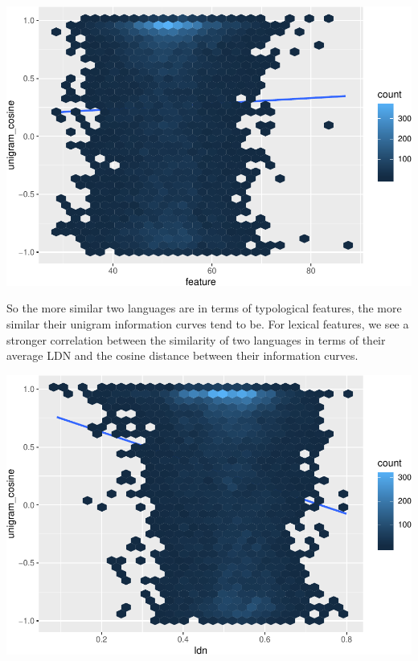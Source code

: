 \documentclass[11pt,]{article}
\newenvironment{Shaded}{\begin{snugshade}}{\end{snugshade}}
\newcommand{\DataTypeTok}[1]{\textcolor[rgb]{0.13,0.29,0.53}{#1}}
\newcommand{\FloatTok}[1]{\textcolor[rgb]{0.00,0.00,0.81}{#1}}
\newcommand{\KeywordTok}[1]{\textcolor[rgb]{0.13,0.29,0.53}{\textbf{#1}}}
\newcommand{\NormalTok}[1]{#1}
\newcommand{\OperatorTok}[1]{\textcolor[rgb]{0.81,0.36,0.00}{\textbf{#1}}}
\newcommand{\StringTok}[1]{\textcolor[rgb]{0.31,0.60,0.02}{#1}}
\begin{document}
\includegraphics{paper_files/figure-latex/wals features vs cosine similarity-1.pdf}

So the more similar two languages are in terms of typological features, the more similar their unigram information curves tend to be. For lexical features, we see a stronger correlation between the similarity of two languages in terms of their average LDN and the cosine distance between their information curves.

\begin{Shaded}
\end{Shaded}

\includegraphics{paper_files/figure-latex/ldn features vs cosine similarity-1.pdf}
\end{document}
